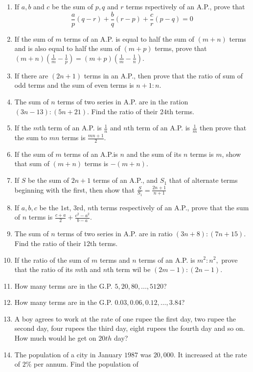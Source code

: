 \begin{enumerate}
\item If $a,b$ and $c$ be the sum of $p, q$ and $r$ terms rspectively of an A.P., prove that $$\frac{a}{p}(q - r) + \frac{b}{q}(r -
  p) + \frac{c}{r}(p - q) = 0$$
\item If the sum of $m$ terms of an A.P. is equal to half the sum of $(m + n)$ terms and is also equal to half the sum of $(m + p)$
  terms, prove that $(m + n)\left(\frac{1}{m} - \frac{1}{p}\right) = (m + p)\left(\frac{1}{m} - \frac{1}{n}\right)$.
\item If there are $(2n + 1)$ terms in an A.P., then prove that the ratio of sum of odd terms and the sum of even terms is $n + 1:
  n$.
\item The sum of $n$ terms of two series in A.P. are in the ration $(3n - 13): (5n + 21)$. Find the ratio of their $24$th terms.
\item If the $m$th term of an A.P. is $\frac{1}{n}$ and $n$th term of an A.P. is $\frac{1}{m}$ then prove that the sum to $mn$
  terms is $\frac{mn + 1}{2}$.
\item If the sum of $m$ terms of an A.P.is $n$ and the sum of its $n$ terms is $m$, show that sum of $(m + n)$ terms is $-(m + n)$.
\item If $S$ be the sum of $2n + 1$ terms of an A.P., and $S_1$ that of alternate terms beginning with the first, then show that
  $\frac{S}{S_1} = \frac{2n + 1}{n + 1}$
\item If $a, b, c$ be the $1$st, $3$rd, $n$th terms respectively of an A.P., prove that the sum of $n$ terms is $\frac{c + a}{2} +
  \frac{c^2 - a^2}{b - a}$.
\item The sum of $n$ terms of two series in A.P. are in ratio $(3n + 8):(7n + 15)$. Find the ratio of their $12$th terms.
\item If the ratio of the sum of $m$ terms and $n$ terms of an A.P. is $m^2:n^2,$ prove that the ratio of its $m$th and $n$th term
  wil be $(2m - 1):(2n -1)$.
\item How many terms are in the G.P. $5, 20, 80, ..., 5120$?
\item How many terms are in the G.P. $0.03, 0.06, 0.12, \ldots, 3.84$?
\item A boy agrees to work at the rate of one rupee the first day, two rupee the second day, four rupees the third day, eight
  rupees the fourth day and so on. How much would he get on $20th$ day?
\item The population of a city in January $1987$ was $20,000$. It increased at the rate of $2\%$ per annum. Find the population of

\end{enumerate}
